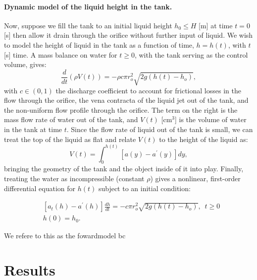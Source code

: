 \documentclass[openacc]{rsproca_new}%
\begin{document}
\paragraph{Dynamic model of the liquid height in the tank.} Now, suppose we fill the tank to an initial liquid height $h_0 \leq H$ [m] at time $t=0$ [s] then allow it drain through the orifice without further input of liquid. We wish to model the height of liquid in the tank as a function of time, $h=h(t)$, with $t$ [s] time. 
A mass balance on water for $t\geq 0$, with the tank serving as the control volume, gives:
\begin{equation}
	\frac{d}{dt} \left ( \rho V(t) \right) = - \rho c \pi r_o^2 \sqrt{2 g(h(t)-h_o)},
\end{equation}
with $c\in(0,1)$ the discharge coefficient \cite{lienhard1984velocity,hicks2014determining,wadhwa2021study,teoman2022discharge} to account for frictional losses in the flow through the orifice, the vena contracta of the liquid jet out of the tank, and the non-uniform flow profile through the orifice. The term on the right is the mass flow rate of water out of the tank, and $V(t)$ [cm$^3$] is the volume of water in the tank at time $t$. 
Since the flow rate of liquid out of the tank is small, we can treat the top of the liquid as flat and relate $V(t)$ to the height of the liquid as: 
\begin{equation}
	V(t)=\int_0^{h(t)} [a(y) - a^\prime(y)]dy,
\end{equation}
bringing the geometry of the tank and the object inside of it into play. Finally, treating the water as incompressible (constant $\rho$) gives a nonlinear, first-order differential equation for $h(t)$ subject to an initial condition:

\begin{align}
& [a_t(h)-a^\prime(h)]\frac{dh}{dt}= -c \pi r_o^2 \sqrt{2g (h(t)-h_o)}, \,\,\, t \geq 0 \\
& h(0)=h_0.
\end{align}

We refere to this as the fowardmodel bc

\section{Results}
\end{document}
